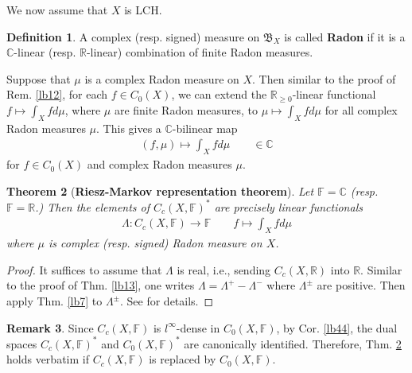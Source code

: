 \documentclass[12pt,b5paper,notitlepage]{article}
\theoremstyle{definition}
\newtheorem{df}{Definition}[subsection]
\newtheorem{rem}[df]{Remark}
\theoremstyle{plain}
\newtheorem{thm}[df]{Theorem}
\newcommand{\fk}{\mathfrak}
\newcommand{\ovl}{\overline}
\newcommand{\Cbb}{\mathbb C}
\newcommand{\Rbb}{\mathbb R}
\newcommand{\Fbb}{\mathbb F}
\numberwithin{equation}{section}
\begin{document}
We now assume that $X$ is LCH. 

\begin{df}
A complex (resp. signed) measure on $\fk B_X$ is called \textbf{Radon} if it is a $\Cbb$-linear (resp. $\Rbb$-linear) combination of finite Radon measures. 
\end{df}

Suppose that $\mu$ is a complex Radon measure on $X$. Then similar to the proof of Rem. \ref{lb12}, for each $f\in C_0(X)$, we can extend the $\Rbb_{\geq0}$-linear functional $f\mapsto\int_X fd\mu$, where $\mu$ are finite Radon measures, to $\mu\mapsto \int_X fd\mu$ for all complex Radon measures $\mu$. This gives a $\Cbb$-bilinear map
\begin{align*}
(f,\mu)\mapsto\int_X fd\mu\qquad\in\Cbb
\end{align*}
for $f\in C_0(X)$ and complex Radon measures $\mu$.



\begin{thm}[\textbf{Riesz-Markov representation theorem}] \label{lb8}
Let $\Fbb=\Cbb$ (resp. $\Fbb=\Rbb$.) Then the elements of $C_c(X,\Fbb)^*$ are precisely linear functionals
\begin{align*}
\Lambda:C_c(X,\Fbb)\rightarrow\Fbb \qquad f\mapsto \int_X fd\mu
\end{align*}
where $\mu$ is complex (resp. signed) Radon measure on $X$.
\end{thm}




\begin{proof}
It suffices to assume that $\Lambda$ is real, i.e., sending $C_c(X,\Rbb)$ into $\Rbb$. Similar to the proof of Thm. \ref{lb13}, one writes $\Lambda=\Lambda^+-\Lambda^-$ where $\Lambda^\pm$ are positive. Then apply Thm. \ref{lb7} to $\Lambda^\pm$. See \cite[Subsec. 25.10.2]{Gui-A} for details.
\end{proof}




\begin{rem}
Since $C_c(X,\Fbb)$ is $l^\infty$-dense in $C_0(X,\Fbb)$, by Cor. \ref{lb44}, the dual spaces $C_c(X,\Fbb)^*$ and $C_0(X,\Fbb)^*$ are canonically identified. Therefore, Thm. \ref{lb8} holds verbatim if $C_c(X,\Fbb)$ is replaced by $C_0(X,\Fbb)$.  
\end{rem}


\begin{comment}
\begin{df}
Let $\mu$ be a complex Radon measure on $X$. Let $\Lambda\in C_c(X,\Fbb)^*=C_0(X,\Fbb)^*$ be the linear functional corresponding to $\mu$ as in Thm. \ref{lb8}. The \textbf{total variation} \pmb{$\Vert\mu\Vert$} \index{00@Total variation $\Vert\mu\Vert$} \index{zz@$\Vert\mu\Vert$, the total variation} is defined to be the operator norm of $\Lambda$, i.e.,
\begin{align*}
\Vert\mu\Vert=\Vert\Lambda\Vert=\sup_{f\in \ovl B_{C_c(X)}(0,1)}|\Lambda(f)|=\sup_{f\in \ovl B_{C_0(X)}(0,1)}|\Lambda(f)|
\end{align*}
\end{df}
\end{comment}
\end{document}
